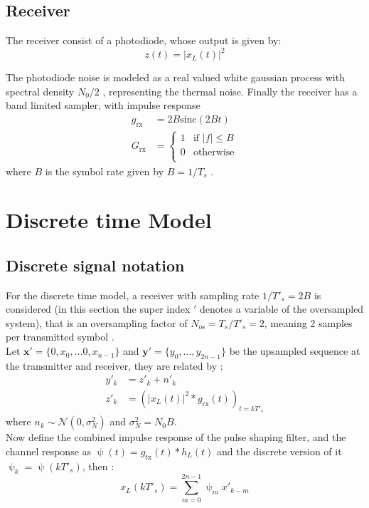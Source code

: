 \subsection{Receiver}
The receiver consist of a photodiode, whose output is given by:
\begin{equation}
z(t)=|x_L(t)|^2
\end{equation}

The photodiode noise is modeled as a real valued white gaussian process with spectral density $N_0/2$ \cite{Plabst_DD}, representing the thermal noise. Finally the receiver has a band limited sampler, with impulse response  
\begin{align}
	g_\text{rx}&=2B\text{sinc}\left(2Bt\right)\\
	G_\text{rx}&=\left\{
\begin{array}{ll}
1  &  \text{if }|f|\leq B   \\
0  &  \text{otherwise} \\
\end{array}
\right.
\end{align}
where $B$ is the symbol rate given by $B=1/T_s$ \cite{Plabst_DD}.



\section{Discrete time Model}

\subsection{Discrete signal notation}
For the discrete time model, a receiver with sampling rate $1/T'_s=2B$ is considered (in this section the super index $'$ denotes a variable of the oversampled system), that is an oversampling factor of $N_\text{os}=T_s/T'_s=2$, meaning 2 samples per transmitted symbol \cite{Plabst_DD}.\\

Let $\bm x'=\{0,x_0,\dotsc0,x_{n-1}\}$ and $\bm y'=\{y_0,\dotsc,y_{2n-1}\}$ be the upsampled sequence at the transmitter and receiver, they are related by \cite{Plabst_DD}:
\begin{align}
y'_k&=z'_k+n'_k \\
z'_k&=\left(|x_L(t)|^2*g_\text{rx}(t)\right)_{t=kT'_s}
\end{align}
where $n_k\sim\mathcal N(0,\sigma_N^2)$ and $\sigma_N^2=N_0B$.\\

Now define the combined impulse response of the pulse shaping filter, and the channel response as $\uppsi(t)=g_\text{tx}(t)*h_L(t)$ and the discrete version of it $\uppsi_k=\uppsi(kT'_s)$, then \cite{Plabst_DD}:
\begin{equation}
x_L(kT'_s)=\sum_{m=0}^{2n-1}\uppsi_mx'_{k-m}
\end{equation}


